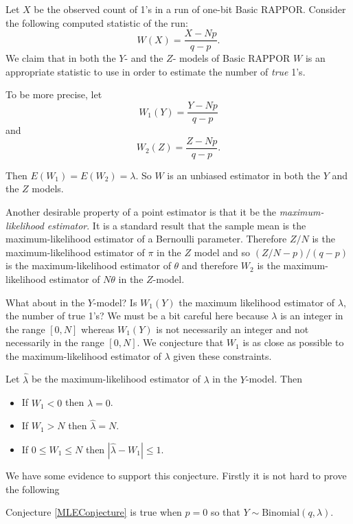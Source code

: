 \documentclass[oneside,12pt]{amsart}
\begin{document}
Let $X$ be the observed count of 1's in a run of one-bit Basic RAPPOR. Consider
the following computed statistic of the run:
$$W(X) = \frac{X-N p}{q-p}.$$
We claim that in both the $Y$- and the $Z$- models of Basic RAPPOR $W$ is an
appropriate statistic to use in order to estimate the number of \emph{true} 1's.

To be more precise, let
$$W_1(Y) = \frac{Y-N p}{q-p}$$
and
$$W_2(Z) = \frac{Z-N p}{q-p}.$$

Then $E(W_1) = E(W_2) = \lambda$.  So $W$ is an unbiased estimator in both
the $Y$ and the $Z$ models.

Another desirable property of a point
estimator is that it be the \emph{maximum-likelihood estimator}. It is a standard
result that the sample mean is the maximum-likelihood estimator of a
Bernoulli parameter. Therefore $Z/N$ is the maximum-likelihood estimator
of $\pi$ in the $Z$ model and so $(Z/N - p)/(q-p)$ is the maximum-likelihood
estimator of $\theta$ and therefore $W_2$ is the maximum-likelihood estimator
of $N \theta$ in the $Z$-model.

What about in the $Y$-model? Is $W_1(Y)$ the maximum likelihood estimator
of $\lambda$, the number of true 1's? We must be a bit careful here because
$\lambda$ is an integer in the range $[0, N]$ whereas $W_1(Y)$ is not
necessarily an integer and not necessarily in the range $[0, N]$. We conjecture
that $W_1$ is as close as possible to the maximum-likelihood estimator of $\lambda$
given these constraints.

\begin{conjecture}
\label{MLEConjecture}
Let $\hat{\lambda}$ be the maximum-likelihood estimator of $\lambda$ in the
$Y$-model. Then
\begin{itemize}
\item If $W_1 < 0$ then $\hat{\lambda} = 0$.
\item If $W_1 > N$ then $\hat{\lambda} = N$.
\item If $0 \leq W_1 \leq N$ then $|\hat{\lambda} - W_1| \leq 1$.
\end{itemize}
\end{conjecture}

We have some evidence to support this conjecture. Firstly it is not hard to prove
the following

\begin{fact}
Conjecture \ref{MLEConjecture} is true when $p=0$ so that $Y\sim\text{Binomial}(q, \lambda).$
\end{fact}
\end{document}
